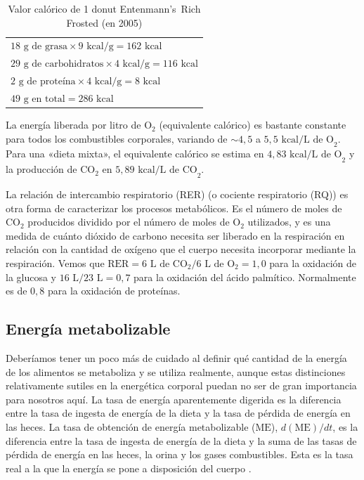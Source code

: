 \documentclass[12pt]{book}
\begin{document}
\begin{table}[htbp]
\centering
\caption{Valor calórico de 1 donut Entenmann's\texttrademark\ Rich Frosted (en 2005)}
\label{tab:64}
\begin{tabularx}{0.6\textwidth}{X}
\toprule
$18\text{ g de grasa} \times 9\text{ kcal/g} = 162\text{ kcal}$ \\
$29\text{ g de carbohidratos} \times 4\text{ kcal/g} = 116\text{ kcal}$ \\
$2\text{ g de proteína} \times 4\text{ kcal/g} = 8\text{ kcal}$ \\
\midrule
$49\text{ g en total} = 286\text{ kcal}$ \\
\bottomrule
\end{tabularx}
\end{table}

La energía liberada por litro de $\text{O}_2$ (equivalente calórico) es bastante constante para todos los combustibles corporales, variando de $\sim 4,5$ a $5,5\text{ kcal/L de O}_2$. Para una «dieta mixta», el equivalente calórico se estima en $4,83\text{ kcal/L de O}_2$ y la producción de $\text{CO}_2$ en $5,89\text{ kcal/L de CO}_2$.

La relación de intercambio respiratorio (RER) (o cociente respiratorio (RQ)) es otra forma de caracterizar los procesos metabólicos. Es el número de moles de $\text{CO}_2$ producidos dividido por el número de moles de $\text{O}_2$ utilizados, y es una medida de cuánto dióxido de carbono necesita ser liberado en la respiración en relación con la cantidad de oxígeno que el cuerpo necesita incorporar mediante la respiración. Vemos que $\text{RER} = 6\text{ L de CO}_2/6\text{ L de O}_2 = 1,0$ para la oxidación de la glucosa y $16\text{ L}/23\text{ L} = 0,7$ para la oxidación del ácido palmítico. Normalmente es de $0,8$ para la oxidación de proteínas.

\subsection{Energía metabolizable}

Deberíamos tener un poco más de cuidado al definir qué cantidad de la energía de los alimentos se metaboliza y se utiliza realmente, aunque estas distinciones relativamente sutiles en la energética corporal puedan no ser de gran importancia para nosotros aquí. La tasa de energía aparentemente digerida es la diferencia entre la tasa de ingesta de energía de la dieta y la tasa de pérdida de energía en las heces. La tasa de obtención de energía metabolizable ($\text{ME}$), $d(\text{ME})/dt$, es la diferencia entre la tasa de ingesta de energía de la dieta y la suma de las tasas de pérdida de energía en las heces, la orina y los gases combustibles. Esta es la tasa real a la que la energía se pone a disposición del cuerpo \cite{11}.
\end{document}
